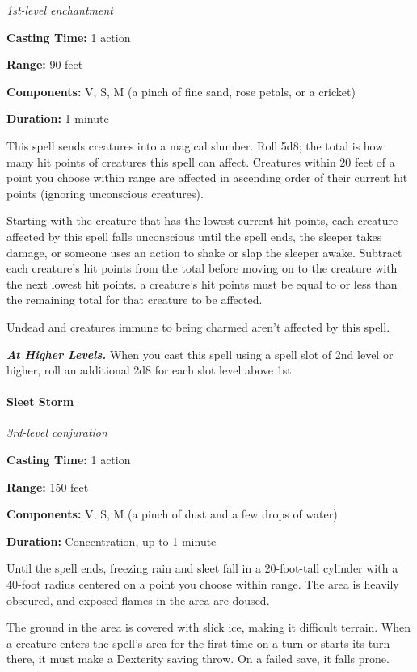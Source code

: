 \documentclass[
]{article}
\begin{document}
\emph{1st-level enchantment}

\textbf{Casting Time:} 1 action

\textbf{Range:} 90 feet

\textbf{Components:} V, S, M (a pinch of fine sand, rose petals, or a
cricket)

\textbf{Duration:} 1 minute

This spell sends creatures into a magical slumber. Roll 5d8; the total
is how many hit points of creatures this spell can affect. Creatures
within 20 feet of a point you choose within range are affected in
ascending order of their current hit points (ignoring unconscious
creatures).

Starting with the creature that has the lowest current hit points, each
creature affected by this spell falls unconscious until the spell ends,
the sleeper takes damage, or someone uses an action to shake or slap the
sleeper awake. Subtract each creature's hit points from the total before
moving on to the creature with the next lowest hit points. a creature's
hit points must be equal to or less than the remaining total for that
creature to be affected.

Undead and creatures immune to being charmed aren't affected by this
spell.

\emph{\textbf{At Higher Levels.}} When you cast this spell using a spell
slot of 2nd level or higher, roll an additional 2d8 for each slot level
above 1st.

\hypertarget{sleet-storm}{%
\paragraph{Sleet Storm}\label{sleet-storm}}

\emph{3rd-level conjuration}

\textbf{Casting Time:} 1 action

\textbf{Range:} 150 feet

\textbf{Components:} V, S, M (a pinch of dust and a few drops of water)

\textbf{Duration:} Concentration, up to 1 minute

Until the spell ends, freezing rain and sleet fall in a 20-foot-tall
cylinder with a 40-foot radius centered on a point you choose within
range. The area is heavily obscured, and exposed flames in the area are
doused.

The ground in the area is covered with slick ice, making it difficult
terrain. When a creature enters the spell's area for the first time on a
turn or starts its turn there, it must make a Dexterity saving throw. On
a failed save, it falls prone.
\end{document}

